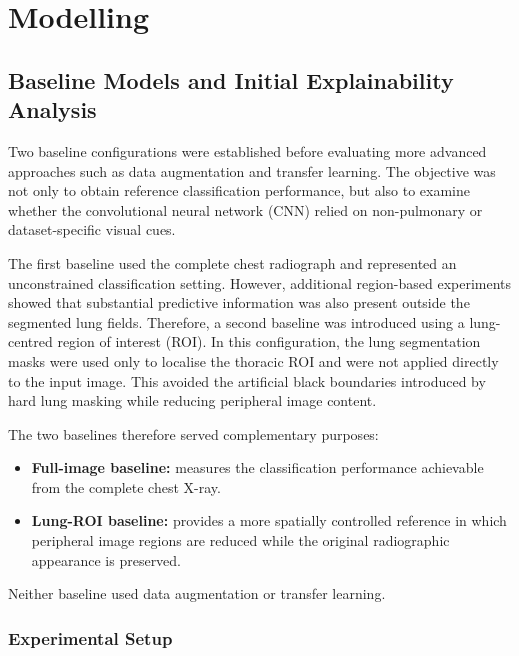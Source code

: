 \chapter{Modelling}


\section{Baseline Models and Initial Explainability Analysis}
\label{sec:baselines}

Two baseline configurations were established before evaluating more advanced
approaches such as data augmentation and transfer learning. The objective was
not only to obtain reference classification performance, but also to examine
whether the convolutional neural network (CNN) relied on non-pulmonary or
dataset-specific visual cues.

The first baseline used the complete chest radiograph and represented an
unconstrained classification setting. However, additional region-based
experiments showed that substantial predictive information was also present
outside the segmented lung fields. Therefore, a second baseline was introduced
using a lung-centred region of interest (ROI). In this configuration, the lung
segmentation masks were used only to localise the thoracic ROI and were not
applied directly to the input image. This avoided the artificial black
boundaries introduced by hard lung masking while reducing peripheral image
content.

The two baselines therefore served complementary purposes:

\begin{itemize}
    \item \textbf{Full-image baseline:} measures the classification performance
    achievable from the complete chest X-ray.
    \item \textbf{Lung-ROI baseline:} provides a more spatially controlled
    reference in which peripheral image regions are reduced while the original
    radiographic appearance is preserved.
\end{itemize}

Neither baseline used data augmentation or transfer learning.

\subsection{Experimental Setup}
\label{subsec:baseline_setup}

